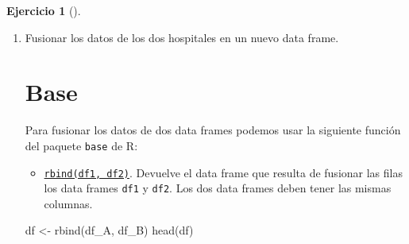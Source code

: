 \documentclass[
  a4paper,
]{scrreport}
\newenvironment{Shaded}{\begin{snugshade}}{\end{snugshade}}
\newcommand{\FunctionTok}[1]{\textcolor[rgb]{0.28,0.35,0.67}{#1}}
\newcommand{\NormalTok}[1]{\textcolor[rgb]{0.00,0.23,0.31}{#1}}
\newcommand{\OtherTok}[1]{\textcolor[rgb]{0.00,0.23,0.31}{#1}}
\providecommand{\tightlist}{%
  \setlength{\itemsep}{0pt}\setlength{\parskip}{0pt}}\usepackage{longtable,booktabs,array}
\theoremstyle{definition}
\newtheorem{exercise}{Ejercicio}[chapter]
\theoremstyle{remark}
\begin{document}
\begin{exercise}[]
\begin{enumerate}
\begin{tcolorbox}
  \end{tcolorbox}
\item
  Fusionar los datos de los dos hospitales en un nuevo data frame.

  \begin{tcolorbox}[enhanced jigsaw, colframe=quarto-callout-tip-color-frame, toprule=.15mm, bottomtitle=1mm, breakable, opacitybacktitle=0.6, toptitle=1mm, colback=white, bottomrule=.15mm, title=\textcolor{quarto-callout-tip-color}{\faLightbulb}\hspace{0.5em}{Solución}, arc=.35mm, left=2mm, titlerule=0mm, rightrule=.15mm, coltitle=black, leftrule=.75mm, opacityback=0, colbacktitle=quarto-callout-tip-color!10!white]

  \section{Base}

  Para fusionar los datos de dos data frames podemos usar la siguiente
  función del paquete \texttt{base} de R:

  \begin{itemize}
  \tightlist
  \item
    \href{https://rdrr.io/r/base/cbind.html}{\texttt{rbind(df1,\ df2)}}.
    Devuelve el data frame que resulta de fusionar las filas los data
    frames \texttt{df1} y \texttt{df2}. Los dos data frames deben tener
    las mismas columnas.
  \end{itemize}

\begin{Shaded}
\begin{Highlighting}[]
\NormalTok{df }\OtherTok{\textless{}{-}} \FunctionTok{rbind}\NormalTok{(df\_A, df\_B)}
\FunctionTok{head}\NormalTok{(df)}
\end{Highlighting}
\end{Shaded}


\end{tcolorbox}
\end{enumerate}
\end{exercise}
\end{document}
